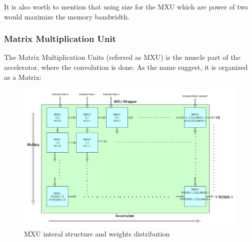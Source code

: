 It is also worth to mention that using size for the MXU which are power of two would maximize the memory bandwidth.

\newpage
\subsubsection{Matrix Multiplication Unit}
The Matrix Multiplication Units (referred as MXU) is the muscle part of the accelerator, where the convolution is done.
As the name suggest, it is organized as a Matrix:
\begin{figure}[H]
\centering
\captionsetup{justification=centering}
\includegraphics[scale=0.35,angle=0]{./figure/mxu.png}
\caption{MXU interal structure and weights distribution}
\label{fig:mxu}
\end{figure} 

